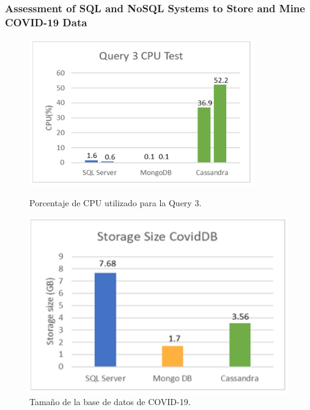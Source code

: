 \begin{frame}
    \frametitle{Assessment of SQL and NoSQL Systems to Store and Mine COVID-19 Data}

    \begin{figure}[H]
        \centering
        \begin{minipage}[b]{0.48\textwidth}
            \centering
            \includegraphics[width=\textwidth]{images/cov19-cpu-test-q3.png}
            \caption{Porcentaje de CPU utilizado para la Query 3.}
            \label{cov19-runtest-q3}
        \end{minipage}
        \hfill
        \begin{minipage}[b]{0.48\textwidth}
            \centering
            \includegraphics[width=\textwidth]{images/cov19-storage.png}
            \caption{Tamaño de la base de datos de COVID-19.}
            \label{cov19-memtest-q3}
        \end{minipage}
    \end{figure}
\end{frame}

